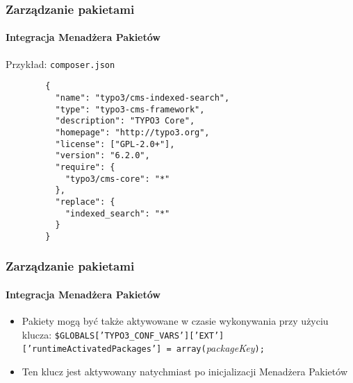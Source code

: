 
\begin{frame}[fragile]
	\frametitle{Zarządzanie pakietami}
	\framesubtitle{Integracja Menadżera Pakietów}

	Przykład: \texttt{composer.json}

	\lstset{
		basicstyle=\tiny\ttfamily
	}

	\begin{lstlisting}
		{
		  "name": "typo3/cms-indexed-search",
		  "type": "typo3-cms-framework",
		  "description": "TYPO3 Core",
		  "homepage": "http://typo3.org",
		  "license": ["GPL-2.0+"],
		  "version": "6.2.0",
		  "require": {
		    "typo3/cms-core": "*"
		  },
		  "replace": {
		    "indexed_search": "*"
		  }
		}
	\end{lstlisting}

\end{frame}


\begin{frame}[fragile]
	\frametitle{Zarządzanie pakietami}
	\framesubtitle{Integracja Menadżera Pakietów}

	\lstset{
		basicstyle=\smaller\ttfamily
	}

	\begin{itemize}
		\item Pakiety mogą być także aktywowane w czasie wykonywania przy użyciu klucza:
			\smaller\texttt{\$GLOBALS['TYPO3\_CONF\_VARS']['EXT']['runtimeActivatedPackages'] = array(}\space\textit{packageKey}\space\texttt{);}\normalsize

		\item Ten klucz jest aktywowany natychmiast po inicjalizacji Menadżera Pakietów

	\end{itemize}

\end{frame}


